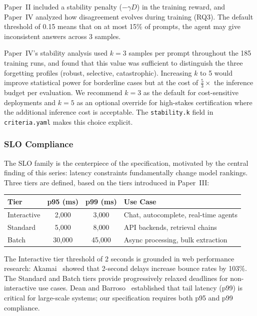 \documentclass[11pt]{article}
\newcommand{\criteriayaml}{\texttt{criteria.yaml}}
\begin{document}
Paper~II included a stability penalty ($-\gamma D$) in the training reward, and Paper~IV analyzed how disagreement evolves during training (RQ3). The default threshold of 0.15 means that on at most 15\% of prompts, the agent may give inconsistent answers across 3 samples.

Paper~IV's stability analysis used $k=3$ samples per prompt throughout the 185 training runs, and found that this value was sufficient to distinguish the three forgetting profiles (robust, selective, catastrophic). Increasing $k$ to 5 would improve statistical power for borderline cases but at the cost of $\frac{5}{3}\times$ the inference budget per evaluation. We recommend $k=3$ as the default for cost-sensitive deployments and $k=5$ as an optional override for high-stakes certification where the additional inference cost is acceptable. The \texttt{stability.k} field in \criteriayaml{} makes this choice explicit.

\subsubsection{SLO Compliance}

The SLO family is the centerpiece of the specification, motivated by the central finding of this series: latency constraints fundamentally change model rankings. Three tiers are defined, based on the tiers introduced in Paper~III:

\begin{center}
\begin{tabular}{lccl}
\toprule
\textbf{Tier} & \textbf{p95 (ms)} & \textbf{p99 (ms)} & \textbf{Use Case} \\
\midrule
Interactive & 2{,}000 & 3{,}000 & Chat, autocomplete, real-time agents \\
Standard & 5{,}000 & 8{,}000 & API backends, retrieval chains \\
Batch & 30{,}000 & 45{,}000 & Async processing, bulk extraction \\
\bottomrule
\end{tabular}
\end{center}

The Interactive tier threshold of 2 seconds is grounded in web performance research: Akamai~\citep{akamai2017performance} showed that 2-second delays increase bounce rates by 103\%. The Standard and Batch tiers provide progressively relaxed deadlines for non-interactive use cases. Dean and Barroso~\citep{dean2013tail} established that tail latency (p99) is critical for large-scale systems; our specification requires both p95 and p99 compliance.
\end{document}
